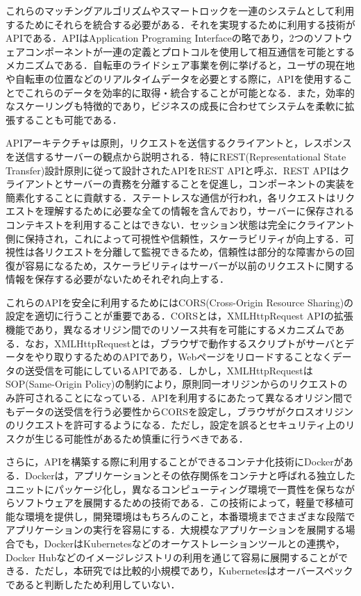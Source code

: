       \par これらのマッチングアルゴリズムやスマートロックを一連のシステムとして利用するためにそれらを統合する必要がある．それを実現するために利用する技術がAPIである．APIはApplication Programing Interfaceの略であり，2つのソフトウェアコンポーネントが一連の定義とプロトコルを使用して相互通信を可能とするメカニズムである．自転車のライドシェア事業を例に挙げると，ユーザの現在地や自転車の位置などのリアルタイムデータを必要とする際に，APIを使用することでこれらのデータを効率的に取得・統合することが可能となる．また，効率的なスケーリングも特徴的であり，ビジネスの成長に合わせてシステムを柔軟に拡張することも可能である．
      \par APIアーキテクチャは原則，リクエストを送信するクライアントと，レスポンスを送信するサーバーの観点から説明される．特にREST(Representational State Transfer)設計原則に従って設計されたAPIをREST APIと呼ぶ．REST APIはクライアントとサーバーの責務を分離することを促進し，コンポーネントの実装を簡素化することに貢献する．ステートレスな通信が行われ，各リクエストはリクエストを理解するために必要な全ての情報を含んでおり，サーバーに保存されるコンテキストを利用することはできない．セッション状態は完全にクライアント側に保持され，これによって可視性や信頼性，スケーラビリティが向上する．可視性は各リクエストを分離して監視できるため，信頼性は部分的な障害からの回復が容易になるため，スケーラビリティはサーバーが以前のリクエストに関する情報を保存する必要がないためそれぞれ向上する．
      \par これらのAPIを安全に利用するためにはCORS(Cross-Origin Resource Sharing)の設定を適切に行うことが重要である．CORSとは，XMLHttpRequest APIの拡張機能であり，異なるオリジン間でのリソース共有を可能にするメカニズムである．なお，XMLHttpRequestとは，ブラウザで動作するスクリプトがサーバとデータをやり取りするためのAPIであり，Webページをリロードすることなくデータの送受信を可能にしているAPIである．しかし，XMLHttpRequestはSOP(Same-Origin Policy)の制約により，原則同一オリジンからのリクエストのみ許可されることになっている．APIを利用するにあたって異なるオリジン間でもデータの送受信を行う必要性からCORSを設定し，ブラウザがクロスオリジンのリクエストを許可するようになる．ただし，設定を誤るとセキュリティ上のリスクが生じる可能性があるため慎重に行うべきである．
      \par さらに，APIを構築する際に利用することができるコンテナ化技術にDockerがある．Dockerは，アプリケーションとその依存関係をコンテナと呼ばれる独立したユニットにパッケージ化し，異なるコンピューティング環境で一貫性を保ちながらソフトウェアを展開するための技術である．この技術によって，軽量で移植可能な環境を提供し，開発環境はもちろんのこと，本番環境までさまざまな段階でアプリケーションの実行を容易にする．大規模なアプリケーションを展開する場合でも，DockerはKubernetesなどのオーケストレーションツールとの連携や，Docker Hubなどのイメージレジストリの利用を通じて容易に展開することができる．ただし，本研究では比較的小規模であり，Kubernetesはオーバースペックであると判断したため利用していない．
